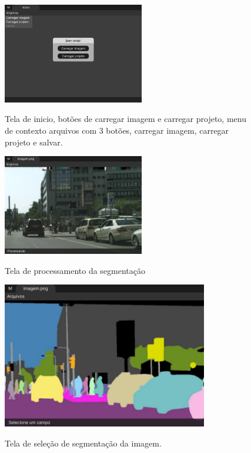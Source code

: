 \begin{figure}[H]
	\centering
    \caption{Tela de inicio, botões de carregar imagem e carregar projeto, menu de contexto arquivos com 3 botões, carregar imagem, carregar projeto e salvar.}
	\includegraphics[width=0.55\textwidth]{figures/tela_novo.png}
	\label{fig:tela_novo}
\end{figure}


\begin{figure}[H]
	\centering
    \caption{Tela de processamento da segmentação}
	\includegraphics[width=0.55\textwidth]{figures/tela_processando_1.png}
	\label{fig:tela_processando_1}
\end{figure}


\begin{figure}[H]
	\centering
    \caption{Tela de seleção de segmentação da imagem.}
	\includegraphics[width=0.8\textwidth]{figures/tela_carregado.png}
	\label{fig:tela_carregado}
\end{figure}


